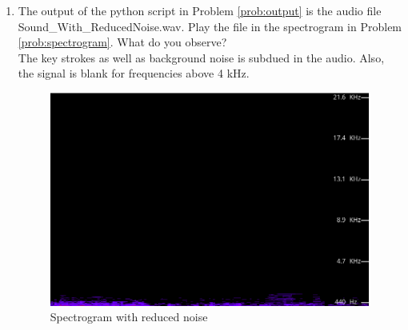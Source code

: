 \documentclass[journal,12pt,twocolumn]{IEEEtran}
\theoremstyle{remark}
\renewcommand\thesection{\arabic{section}}
\begin{document}
\begin{enumerate}[label=\thesection.\arabic*
,ref=\thesection.\theenumi]
\begin{lstlisting}
input_signal,fs = sf.read('Karthik.wav') 

sampl_freq=fs

order=4   

cutoff_freq=4000.0  

Wn=2*cutoff_freq/sampl_freq  

b, a = signal.butter(order,Wn, 'low') 

output_signal = signal.lfilter(b, a, input_signal)

sf.write('Sound_With_ReducedNoise.wav', output_signal, fs) 
\end{lstlisting}

\item
The output of the python script in Problem \ref{prob:output} is the audio file Sound\_With\_ReducedNoise.wav. Play the file in the spectrogram in Problem \ref{prob:spectrogram}. What do you observe?\bigskip
\\
\solution The key strokes as well as background noise is subdued in the audio.  Also,  the signal is blank for frequencies above 4 kHz.
\begin{figure}[htbp]
    \centering
    \includegraphics[width=0.85\columnwidth]{figs/reduced noise spectrogram.png}
    \caption{Spectrogram with reduced noise}
    \label{fig:Spectrogram with reduced noise}
\end{figure}
\end{enumerate}
\end{document}
